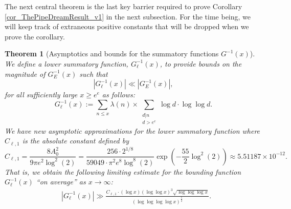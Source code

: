 \documentclass[11pt,reqno,a4letter]{article}
\numberwithin{figure}{section}
\numberwithin{table}{section}
\theoremstyle{plain}
\newtheorem{theorem}{Theorem}
\numberwithin{theorem}{section}
\theoremstyle{definition}
\newcommand{\NBRef}[1]{}
\newcommand{\SuccSim}[0]{\overset{_{\scriptsize{\blacktriangle}}}{\succsim}}
\renewcommand{\SuccSim}[0]{\ensuremath{\gg}}
\begin{document}
The next central theorem is the last key barrier required to prove 
Corollary \ref{cor_ThePipeDreamResult_v1} 
in the next subsection. For the time being, we will keep track of extraneous positive 
constants that will be dropped when we prove the corollary. 

\begin{theorem}[Asymptotics and bounds for the summatory functions $G^{-1}(x)$] 
\label{theorem_gInv_GeneralAsymptoticsForms}
We define a lower summatory function, $G_{\ell}^{-1}(x)$, 
to provide bounds on the magnitude of $G_E^{-1}(x)$ such that 
$$|G_{\ell}^{-1}(x)| \ll |G_E^{-1}(x)|,$$ 
for all sufficiently large $x \geq e^e$ as follows: 
\[
G_{\ell}^{-1}(x) := \sum_{n \leq x} \lambda(n) \times \sum_{\substack{d|n \\ d > e^e}} 
     \log d \cdot \log\log d. 
\]
We have new asymptotic approximations for the lower summatory function where 
$C_{\ell,1}$ is the absolute constant defined by 
\[
C_{\ell,1} = \frac{8 A_0^2}{9 \pi e^2 \log^2(2)}  = 
     \frac{256 \cdot 2^{1/8}}{59049 \cdot \pi^2 e^8 \log^8(2)} 
     \exp\left(-\frac{55}{2} \log^2(2)\right) 
     \approx 5.51187 \times 10^{-12}.  
\]
That is, we obtain the following limiting estimate for the bounding function 
$G_{\ell}^{-1}(x)$ ``on average'' as $x \rightarrow \infty$:   
\begin{align*} 
 & \left\lvert G_{\ell}^{-1}\left(x\right) \right\rvert
     \SuccSim 
     \frac{C_{\ell,1} \cdot (\log x) (\log\log x)^{3} \sqrt{\log\log\log x}}{ 
     (\log\log\log\log x)^{\frac{5}{2}}}. 
\end{align*} 
\end{theorem} 
\NBRef{A10-2020.04-26} 
\end{document}

